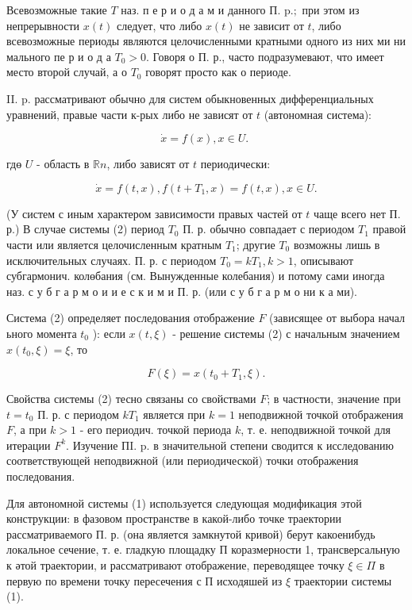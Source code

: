 \documentclass[10pt]{article}
\begin{document}
Всевозможные такие $T$ наз. п е р и о д а м и данного П. $\mathrm{p} . ;$ при этом из непрерывности $x(t)$ следует, что либо $x(t)$ не зависит от $t$, либо всевозможные периоды являются целочисленными кратными одного из них ми ни мального пе р и о д а $T_{0}>0$. Говоря о П. р., часто подразумевают, что имеет место второй случай, а о $T_{0}$ говорят просто как о периоде.

II. p. рассматривают обычно для систем обыкновенных дифференциальных уравнений, правые части к-рых либо не зависят от $t$ (автономная система):

\[
\dot{x}=f(x), x \in U \text {. }
\]

гдө $U$ - область в $\mathbb{R} n$, либо зависят от $t$ периодически:

\[
\dot{x}=f(t, x), f\left(t+T_{1}, x\right)=f(t, x), x \in U .
\]

(У систем с иным характером зависимости правых частей от $t$ чаще всего нет П. р.) В случае системы (2) период $T_{0}$ П. р. обычно совпадает с периодом $T_{1}$ правой части или является целочисленным кратным $T_{1}$; другие $T_{0}$ возможны лишь в исключительных случаях. П. р. с периодом $T_{0}=k T_{1}, k>1$, описывают субгармонич. колөбания (см. Вынужденные колебания) и потому сами иногда наз. с у б г а р м о и и е с к и м и П. р. (или с у б г а р м о ни к а ми).

Система (2) определяет последования отображение $F$ (зависящее от выбора начал ьного момента $t_{0}$ ): если $x(t, \xi)$ - решение системы (2) с начальным значением $x\left(t_{0}, \xi\right)=\xi$, то

\[
F(\xi)=x\left(t_{0}+T_{1}, \xi\right) .
\]

Свойства системы (2) тесно связаны со свойствами $F$; в частности, значение при $t=t_{0}$ П. р. с периодом $k T_{1}$ является при $k=1$ неподвижной точкой отображения $F$, а при $k>1$ - его периодич. точкой периода $k$, т. е. неподвижной точкой для итерации $F^{k}$. Изучение ПI. p. в значительной степени сводится к исследованию соответствующей неподвижной (или периодической) точки отображения последования.

Для автономной системы (1) используется следующая модификация этой конструкции: в фазовом пространстве в какой-либо точке траектории рассматриваемого П. р. (она является замкнутой кривой) берут какоенибудь локальное сечение, т. е. гладкую площадку П коразмерности 1, трансверсальную к әтой траектории, и рассматривают отображение, переводящее точку $\xi \in \Pi$ в первую по времени точку пересечения с П исходяшей из $\xi$ траектории системы (1).
\end{document}
